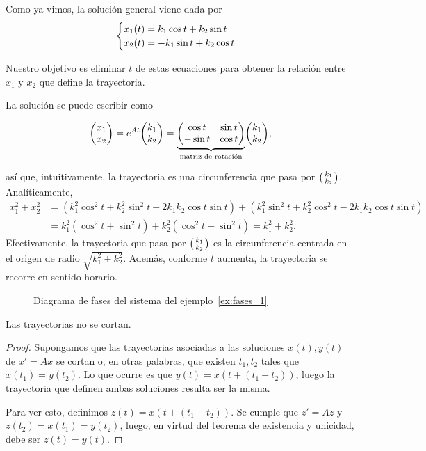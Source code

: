 \documentclass[../ecuaciones_diferenciales.tex]{subfiles}
\begin{document}
\begin{solution}
	Como ya vimos, la solución general viene dada por
	\[\begin{cases}
			x_1(t) = k_1 \cos t + k_2 \sin t \\
			x_2(t) = - k_1 \sin t + k_2 \cos t\end{cases}\]

	Nuestro objetivo es eliminar \(t\) de estas ecuaciones para obtener la
	relación entre \(x_1\) y \(x_2\) que define la trayectoria.

	La solución se puede escribir como

	\[\mat{x_1 \\ x_2} = e^{At}\mat{k_1 \\ k_2} =
		\underbrace{\mat{\cos t & \sin t \\ -\sin t & \cos t}}_{\text{matriz de
				rotación}} \mat{k_1 \\ k_2},\]

	así que, intuitivamente, la trayectoria es una circunferencia que pasa por
	\(\smat{k_1 \\ k_2}\). Analíticamente,
	\begin{align*}
		x_1^2 + x_2^2 & = (k_1^2\cos^2t + k_2^2\sin^2t + 2k_1k_2\cos t \sin t)
		+ (k_1^2\sin^2t + k_2^2\cos^2t - 2k_1k_2\cos t \sin t)                                 \\
		              & = k_1^2(\cos^2 t + \sin^2 t) + k_2^2(\cos^2t + \sin^2t) = k_1^2+k_2^2.
	\end{align*}
	Efectivamente, la trayectoria que pasa por \(\smat{k_1 \\ k_2}\) es la
	circunferencia centrada en el origen de radio \(\sqrt{k_1^2+k_2^2}\). Además,
	conforme \(t\) aumenta, la trayectoria se recorre en sentido horario.
\end{solution}

\begin{figure}[ht]
	\centering
	\caption{Diagrama de fases del sistema del ejemplo~\ref{ex:fases_1}}
\end{figure}


\begin{theorem}
	Las trayectorias no se cortan.
	\begin{proof}
		Supongamos que las trayectorias asociadas a las soluciones \(x(t), y(t)\) de
		\(x' = Ax\) se cortan o, en otras palabras, que existen \(t_1, t_2\) tales
		que \(x(t_1) = y(t_2)\). Lo que ocurre es que \(y(t) = x(t + (t_1-t_2))\),
		luego la trayectoria que definen ambas soluciones resulta ser la misma.

		Para ver esto, definimos \(z(t) = x(t + (t_1-t_2))\). Se cumple que \(z' =
		Az\) y \(z(t_2) = x(t_1) = y(t_2)\), luego, en virtud del teorema de
		existencia y unicidad, debe ser \(z(t) = y(t)\).
	\end{proof}
\end{theorem}
\end{document}
